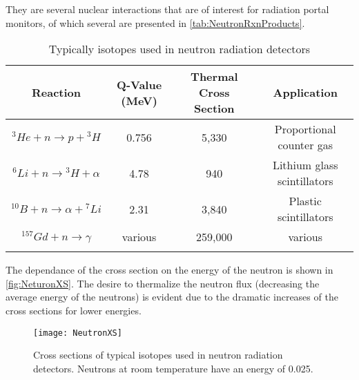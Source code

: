 They are several nuclear interactions that are of interest for radiation portal monitors, of which several are presented in \autoref{tab:NeutronRxnProducts}.
\begin{table}
	\caption[Neutron Reactions and Reaction Energies]{Typically isotopes used in neutron radiation detectors}
	\label{tab:NeutronRxnProducts}
	\begin{tabular}{ c | c c c} 
		\toprule
		Reaction                           & Q-Value (MeV) & Thermal Cross Section & Application \\
		\midrule
		${}^3He + n \to p +{}^3H$          & 0.756     & 5,330 & Proportional counter gas \\
		${}^6Li + n \to {}^3H + \alpha$    & 4.78      & 940 & Lithium glass scintillators \\
		${}^{10}B + n \to \alpha + {}^7Li$ & 2.31      & 3,840 & Plastic scintillators \\
		${}^{157}Gd + n \to \gamma$        &various    & 259,000 & various \\
		\bottomrul
	\end{tabular}
\end{table}
The dependance of the cross section on the energy of the neutron is shown in \autoref{fig:NeturonXS}.
The desire to thermalize the neutron flux (decreasing the average energy of the neutrons) is evident due to the dramatic increases of the cross sections for lower energies.
\begin{figure}
	\centering
	\texttt{[image: NeutronXS]}
	\caption[Neutron Reaction Cross Sections]{Cross sections of typical isotopes used in neutron radiation detectors.  Neutrons at room temperature have an energy of \SI{0.025}{\ev}.}
	\label{fig:NeutronXS}
\end{figure}